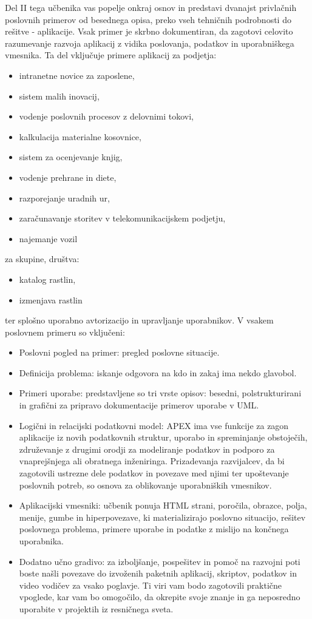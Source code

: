 \vspace{0.5cm}
\noindent Del II tega učbenika vas popelje onkraj osnov in predstavi dvanajst privlačnih poslovnih primerov od besednega opisa, preko vseh tehničnih podrobnosti do rešitve - aplikacije. Vsak primer je skrbno dokumentiran, da zagotovi celovito razumevanje razvoja aplikacij z vidika poslovanja, podatkov in uporabniškega vmesnika. Ta del vključuje primere aplikacij za podjetja:
\begin{itemize}
	\item intranetne novice za zaposlene, 
	\item sistem malih inovacij, 
	\item vodenje poslovnih procesov z delovnimi tokovi, 	
	\item kalkulacija materialne kosovnice, 	
	\item sistem za ocenjevanje knjig, 	
	\item vodenje prehrane in diete,	 
	\item razporejanje uradnih ur, 	
	\item zaračunavanje storitev v telekomunikacijskem podjetju, 	
	\item najemanje vozil
\end{itemize}   
za skupine, društva:
\begin{itemize}
	\item katalog rastlin, 
	\item izmenjava rastlin
\end{itemize} 
ter splošno uporabno avtorizacijo in upravljanje uporabnikov.
\noindent V vsakem poslovnem primeru so vključeni:
\begin{itemize}
	\item Poslovni pogled na primer: pregled poslovne situacije.
	\item Definicija problema: iskanje odgovora na kdo in zakaj ima nekdo glavobol.
	\item Primeri uporabe: predstavljene so tri vrste opisov: besedni, polstrukturirani in grafični za pripravo dokumentacije primerov uporabe v UML.
	\item Logični in relacijski podatkovni model: APEX ima vse funkcije za zagon aplikacije iz novih podatkovnih struktur, uporabo in spreminjanje obstoječih, združevanje z drugimi orodji za modeliranje podatkov in podporo za vnaprejšnjega ali obratnega inženiringa. Prizadevanja razvijalcev, da bi zagotovili ustrezne dele podatkov in povezave med njimi ter upoštevanje poslovnih potreb, so osnova za oblikovanje uporabniških vmesnikov.	
	\item Aplikacijski vmesniki: učbenik ponuja HTML strani, poročila, obrazce, polja, menije, gumbe in hiperpovezave, ki materializirajo poslovno situacijo, rešitev poslovnega problema, primere uporabe in podatke z mislijo na končnega uporabnika.
	\item Dodatno učno gradivo: za izboljšanje, pospešitev in pomoč na razvojni poti boste našli povezave do izvoženih paketnih aplikacij, skriptov, podatkov in video vodičev za vsako poglavje. Ti viri vam bodo zagotovili praktične vpoglede, kar vam bo omogočilo, da okrepite svoje znanje in ga neposredno uporabite v projektih iz resničnega sveta.
\end{itemize}

